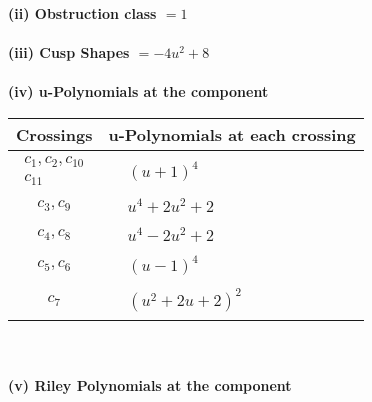 \documentclass[1p]{elsarticle_modified}
\theoremstyle{definition}
\begin{document}
\flushleft \textbf{(ii) Obstruction class $= 1$}\\~\\
\flushleft \textbf{(iii) Cusp Shapes $= -4 u^2+8$}\\~\\
\newpage\renewcommand{\arraystretch}{1}
\flushleft \textbf{(iv) u-Polynomials at the component}\newline \\
\begin{tabular}{m{50pt}|m{274pt}}
Crossings & \hspace{64pt}u-Polynomials at each crossing \\
\hline $$\begin{aligned}c_{1},c_{2},c_{10}\\c_{11}\end{aligned}$$&$\begin{aligned}
&(u+1)^4
\end{aligned}$\\
\hline $$\begin{aligned}c_{3},c_{9}\end{aligned}$$&$\begin{aligned}
&u^4+2 u^2+2
\end{aligned}$\\
\hline $$\begin{aligned}c_{4},c_{8}\end{aligned}$$&$\begin{aligned}
&u^4-2 u^2+2
\end{aligned}$\\
\hline $$\begin{aligned}c_{5},c_{6}\end{aligned}$$&$\begin{aligned}
&(u-1)^4
\end{aligned}$\\
\hline $$\begin{aligned}c_{7}\end{aligned}$$&$\begin{aligned}
&(u^2+2 u+2)^2
\end{aligned}$\\
\hline
\end{tabular}\\~\\
\newpage\renewcommand{\arraystretch}{1}
\flushleft \textbf{(v) Riley Polynomials at the component}\newline \\
\end{document}
